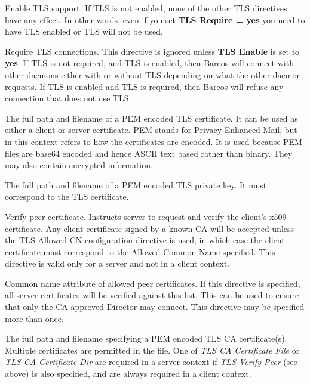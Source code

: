 \begin{description}
Enable TLS support.  If TLS is not enabled, none of the other TLS directives
have any effect. In other words, even if you set {\bf TLS Require = yes}
you need to have TLS enabled or TLS will not be used.

Require TLS connections.  This directive is ignored unless {\bf TLS Enable}
is set to {\bf yes}.  If TLS is not required, and TLS is enabled, then
Bareos will connect with other daemons either with or without TLS depending
on what the other daemon requests.  If TLS is enabled and TLS is required,
then Bareos will refuse any connection that does not use TLS.

The full path and filename of a PEM encoded TLS certificate.  It can be
used as either a client or server certificate.  PEM stands for Privacy
Enhanced Mail, but in this context refers to how the certificates are
encoded.  It is used because PEM files are base64 encoded and hence ASCII
text based rather than binary.  They may also contain encrypted
information.

The full path and filename of a PEM encoded TLS private key.  It must
correspond to the TLS certificate.

Verify peer certificate.  Instructs server to request and verify the
client's x509 certificate.  Any client certificate signed by a known-CA
will be accepted unless the TLS Allowed CN configuration directive is used,
in which case the client certificate must correspond to the Allowed
Common Name specified. This directive is valid only for a server
and not in a client context.

Common name attribute of allowed peer certificates.  If this directive is
specified, all server certificates will be verified against this list. This
can be used to ensure that only the CA-approved Director may connect.
This directive may be specified more than once.

The full path and filename specifying a
PEM encoded TLS CA certificate(s).  Multiple certificates are
permitted in the file.  One of \emph{TLS CA Certificate File} or \emph{TLS
CA Certificate Dir} are required in a server context if \emph{TLS
Verify Peer} (see above) is also specified, and are always required in a client
context.


\end{description}
